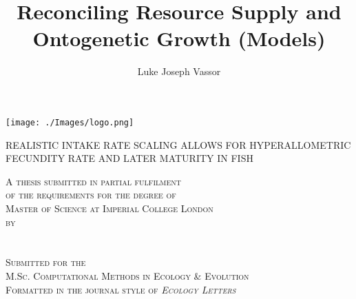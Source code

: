 \documentclass[a4paper]{article} %
\title{Reconciling Resource Supply and Ontogenetic Growth (Models)}
\author{Luke Joseph Vassor}
\begin{document}
\begin{titlepage}
    
    \texttt{[image: ./Images/logo.png]}\\%
     
    
    \center %
    
    
    \makeatletter
    \linespread{1.5} %
        {\huge{REALISTIC INTAKE RATE SCALING ALLOWS FOR HYPERALLOMETRIC FECUNDITY RATE AND LATER MATURITY IN FISH}\par} %
    \vspace{2.5cm} %

    \textsc{A thesis submitted in partial fulfilment \\ of the requirements for the degree of \\ Master of Science at Imperial College London \\ by \\ \ }\\[2.5cm]
    \textsc{\Large \@author}\\[2.5cm]
    \textsc{Submitted for the \\ M.Sc. Computational Methods in Ecology \& Evolution \\ Formatted in the journal style of \textsl{\textsc{Ecology Letters}} \\ \ }\\[1.5cm]


\end{titlepage}
\end{document}
